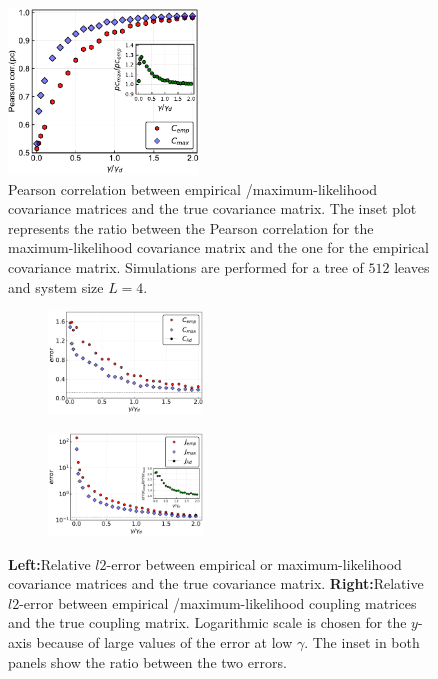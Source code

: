 \documentclass[preprint,amsmath,amssymb,superscriptaddress,showpacs,pre]{revtex4-1}
\begin{document}
\begin{figure}[!htb]
	\centering
	\includegraphics[keepaspectratio=true,width=0.45\textwidth]{Figures/corr_C_L4_balanced_tree_100_rep.pdf}
	\caption{ Pearson correlation between empirical /maximum-likelihood   covariance matrices and the true covariance matrix. The inset plot represents the ratio between the Pearson correlation for the  maximum-likelihood covariance matrix and the one for the empirical covariance matrix. Simulations are performed for a tree of $512$ leaves  and  system size $L=4$.}
	\label{fig:pears_L4}
\end{figure}



\begin{figure}[!htb]
		\begin{subfigure}{}
			\centering\includegraphics[keepaspectratio=true,width=0.45\textwidth]{Figures/epsilon_error_C_L4_balanced_tree_100.pdf}
		\end{subfigure}
		\hspace{1mm}
		\begin{subfigure}{}
			\centering\includegraphics[keepaspectratio=true,width=0.45\textwidth]{Figures/epsilon_error_J_L4_balanced_tree_100.pdf}
		\end{subfigure}
	\caption{\textbf{Left:}Relative $l2$-error between empirical or maximum-likelihood  covariance matrices and the true covariance matrix.  \textbf{Right:}Relative $l2$-error between empirical /maximum-likelihood  coupling matrices and the true coupling matrix. Logarithmic scale is chosen for the $y$-axis because of large values of the error at low $\gamma$. The inset in both panels show the ratio between the two errors.}
	\label{fig:error_1_L4}
\end{figure}
\end{document}
